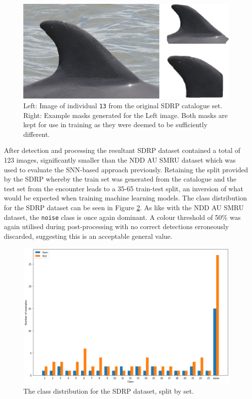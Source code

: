 \begin{figure}
	\begin{center}
		\includegraphics[scale=0.5]{Chapter6/figs/SDRP-double-mask-eg-indv-13.png}
	\end{center}
	\caption{Left: Image of individual \texttt{13} from the original SDRP catalogue set. Right: Example masks generated for the Left image. Both masks are kept for use in training as they were deemed to be sufficiently different.}
	\label{fig:sdrp-double-mask-eg}
\end{figure}

After detection and processing the resultant SDRP dataset contained a total of 123 images, significantly smaller than the NDD AU SMRU dataset which was used to evaluate the SNN-based approach previously. Retaining the split provided by the SDRP whereby the train set was generated from the catalogue and the test set from the encounter leads to a 35-65 train-test split, an inversion of what would be expected when training machine learning models. The class distribution for the SDRP dataset can be seen in Figure \ref{fig:sdrp-dist}. As like with the NDD AU SMRU dataset, the \texttt{noise} class is once again dominant. A colour threshold of 50\% was again utilised during post-processing with no correct detections erroneously discarded, suggesting this is an acceptable general value.

\begin{figure}[h]
	\begin{center}
		\includegraphics[scale=0.38]{Chapter6/figs/SDRP-class-dist.png}
	\end{center}
	\caption{The class distribution for the SDRP dataset, split by set.}
	\label{fig:sdrp-dist}
\end{figure}


